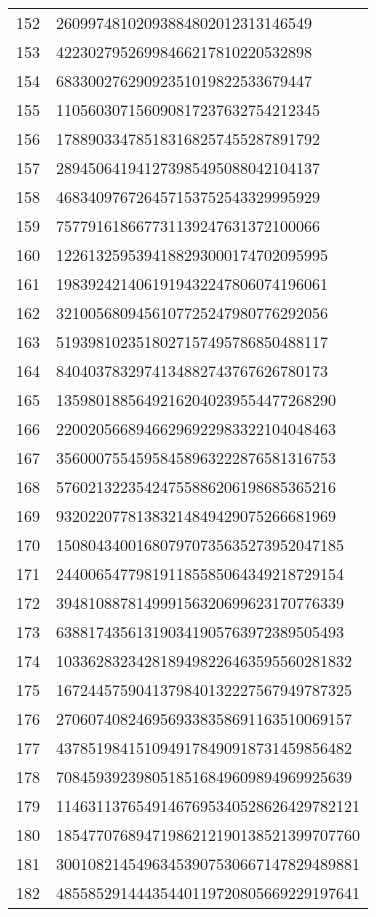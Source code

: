 \documentclass[12pt]{article}
\begin{document}
\begin{tabular}{l|l}
152 & 26099748102093884802012313146549 \\
153 & 42230279526998466217810220532898 \\
154 & 68330027629092351019822533679447 \\
155 & 110560307156090817237632754212345 \\
156 & 178890334785183168257455287891792 \\
157 & 289450641941273985495088042104137 \\
158 & 468340976726457153752543329995929 \\
159 & 757791618667731139247631372100066 \\
160 & 1226132595394188293000174702095995 \\
161 & 1983924214061919432247806074196061 \\
162 & 3210056809456107725247980776292056 \\
163 & 5193981023518027157495786850488117 \\
164 & 8404037832974134882743767626780173 \\
165 & 13598018856492162040239554477268290 \\
166 & 22002056689466296922983322104048463 \\
167 & 35600075545958458963222876581316753 \\
168 & 57602132235424755886206198685365216 \\
169 & 93202207781383214849429075266681969 \\
170 & 150804340016807970735635273952047185 \\
171 & 244006547798191185585064349218729154 \\
172 & 394810887814999156320699623170776339 \\
173 & 638817435613190341905763972389505493 \\
174 & 1033628323428189498226463595560281832 \\
175 & 1672445759041379840132227567949787325 \\
176 & 2706074082469569338358691163510069157 \\
177 & 4378519841510949178490918731459856482 \\
178 & 7084593923980518516849609894969925639 \\
179 & 11463113765491467695340528626429782121 \\
180 & 18547707689471986212190138521399707760 \\
181 & 30010821454963453907530667147829489881 \\
182 & 48558529144435440119720805669229197641 \\

\end{tabular}
\end{document}
